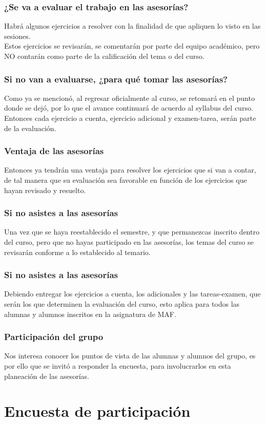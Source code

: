 \begin{frame}
\frametitle{¿Se va a evaluar el trabajo en las asesorías?}
Habrá algunos ejercicios a resolver con la finalidad de que apliquen lo visto en las sesiones.
\\
\bigskip
\pause
Estos ejercicios se revisarán, se comentarán por parte del equipo académico, pero NO contarán como parte de la calificación del tema o del curso.
\end{frame}
\begin{frame}
\frametitle{Si no van a evaluarse, ¿para qué tomar las asesorías?}
Como ya se mencionó, al regresar oficialmente al curso, se retomará en el punto donde se dejó, por lo que el avance continuará de acuerdo al syllabus del curso.
\\
\bigskip
\pause
Entonces cada ejercicio a cuenta, ejercicio adicional y examen-tarea, serán parte de la evaluación.
\end{frame}
\begin{frame}
\frametitle{Ventaja de las asesorías}
Entonces ya tendrán una ventaja para resolver los ejercicios que si van a contar, de tal manera que su evaluación sea favorable en función de los ejercicios que hayan revisado y resuelto.
\end{frame}
\begin{frame}
\frametitle{Si no asistes a las asesorías}
Una vez que se haya reestablecido el semestre, y que permanezcas inscrito dentro del curso, pero que no hayas participado en las asesorías, los temas del curso se revisarán conforme a lo establecido al temario.
\end{frame}
\begin{frame}
\frametitle{Si no asistes a las asesorías}
Debiendo entregar los ejercicios a cuenta, los adicionales y las tareas-examen, que serán los que determinen la evaluación del curso, esto aplica para todos las alumnas y alumnos inscritos en la asignatura de MAF.
\end{frame}
\begin{frame}
\frametitle{Participación del grupo}
Nos interesa conocer los puntos de vista de las alumnas y alumnos del grupo, es por ello que se invitó a responder la encuesta, para involucrarlos en esta planeación de las asesorías.
\end{frame}
\section{Encuesta de participación}
